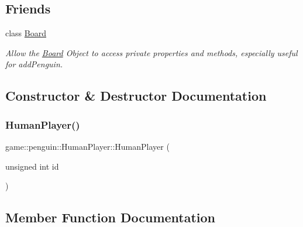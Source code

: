 \subsection*{Friends}
\begin{DoxyCompactItemize}
\item 
class \hyperlink{classgame_1_1penguin_1_1_human_player_a12525b6ed7c8186be0bee5cf78e2a49c}{Board}
\begin{DoxyCompactList}\small\item\em Allow the \hyperlink{classgame_1_1penguin_1_1_board}{Board} Object to access private properties and methods, especially useful for add\+Penguin. \end{DoxyCompactList}\end{DoxyCompactItemize}


\subsection{Constructor \& Destructor Documentation}
\mbox{\label{classgame_1_1penguin_1_1_human_player_a4f91e8095a6c97c1a099d1576910267e}} 
\subsubsection{\texorpdfstring{Human\+Player()}{HumanPlayer()}}
{\footnotesize\ttfamily game\+::penguin\+::\+Human\+Player\+::\+Human\+Player (\begin{DoxyParamCaption}\item[{unsigned int}]{id }\end{DoxyParamCaption})\hspace{0.3cm}{\ttfamily [explicit]}}



\subsection{Member Function Documentation}
\mbox{\label{classgame_1_1penguin_1_1_human_player_a1474720bb1f767c195ac316dd6a8ee82}} 
